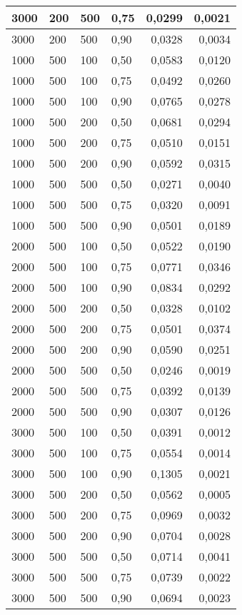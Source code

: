 \documentclass[11pt,a4paper,oneside]{report}
\begin{document}
\begin{center}
\begin{longtable}{|l|l|l|l|r@{$\pm$}r|}
		3000 & 200 & 500 & 0,75 & 0,0299 & 0,0021\\ \hline
		3000 & 200 & 500 & 0,90 & 0,0328 & 0,0034\\ \hline
		1000 & 500 & 100 & 0,50 & 0,0583 & 0,0120\\ \hline
		1000 & 500 & 100 & 0,75 & 0,0492 & 0,0260\\ \hline
		1000 & 500 & 100 & 0,90 & 0,0765 & 0,0278\\ \hline
		1000 & 500 & 200 & 0,50 & 0,0681 & 0,0294\\ \hline
		1000 & 500 & 200 & 0,75 & 0,0510 & 0,0151\\ \hline
		1000 & 500 & 200 & 0,90 & 0,0592 & 0,0315\\ \hline
		1000 & 500 & 500 & 0,50 & 0,0271 & 0,0040\\ \hline
		1000 & 500 & 500 & 0,75 & 0,0320 & 0,0091\\ \hline
		1000 & 500 & 500 & 0,90 & 0,0501 & 0,0189\\ \hline
		2000 & 500 & 100 & 0,50 & 0,0522 & 0,0190\\ \hline
		2000 & 500 & 100 & 0,75 & 0,0771 & 0,0346\\ \hline
		2000 & 500 & 100 & 0,90 & 0,0834 & 0,0292\\ \hline
		2000 & 500 & 200 & 0,50 & 0,0328 & 0,0102\\ \hline
		2000 & 500 & 200 & 0,75 & 0,0501 & 0,0374\\ \hline
		2000 & 500 & 200 & 0,90 & 0,0590 & 0,0251\\ \hline
		2000 & 500 & 500 & 0,50 & 0,0246 & 0,0019\\ \hline
		2000 & 500 & 500 & 0,75 & 0,0392 & 0,0139\\ \hline
		2000 & 500 & 500 & 0,90 & 0,0307 & 0,0126\\ \hline
		3000 & 500 & 100 & 0,50 & 0,0391 & 0,0012\\ \hline
		3000 & 500 & 100 & 0,75 & 0,0554 & 0,0014\\ \hline
		3000 & 500 & 100 & 0,90 & 0,1305 & 0,0021\\ \hline
		3000 & 500 & 200 & 0,50 & 0,0562 & 0,0005\\ \hline
		3000 & 500 & 200 & 0,75 & 0,0969 & 0,0032\\ \hline
		3000 & 500 & 200 & 0,90 & 0,0704 & 0,0028\\ \hline
		3000 & 500 & 500 & 0,50 & 0,0714 & 0,0041\\ \hline
		3000 & 500 & 500 & 0,75 & 0,0739 & 0,0022\\ \hline
		3000 & 500 & 500 & 0,90 & 0,0694 & 0,0023\\ \hline
	\end{longtable}
\end{center}
\end{document}
